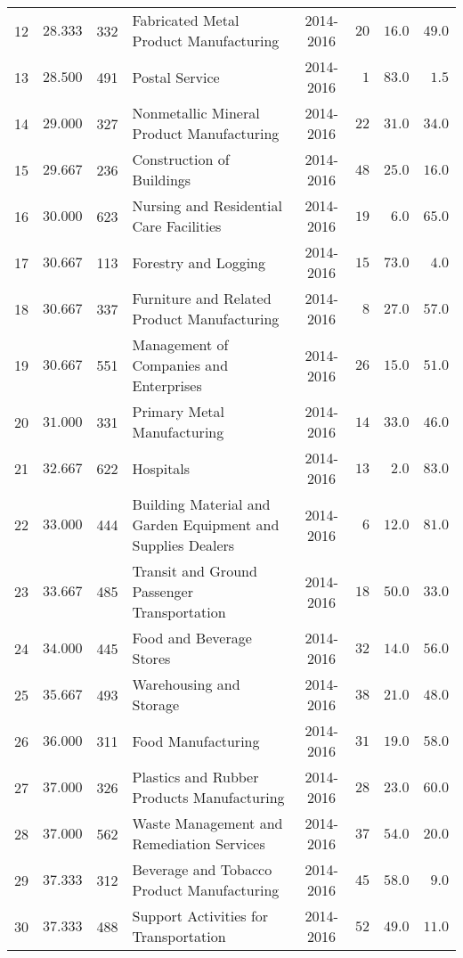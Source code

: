 \documentclass[9pt, oneside]{article}   	%
\begin{document}
\begin{longtable}{cccp{2.0in}cccc}
12  & $28.333$ & 332 & Fabricated Metal Product Manufacturing & 2014-2016 & $20$ & $16.0$ & $49.0$ \\
13  & $28.500$ & 491 & Postal Service & 2014-2016 & $\phantom{0}1$ & $83.0$ & $\phantom{0}1.5$ \\
14  & $29.000$ & 327 & Nonmetallic Mineral Product Manufacturing & 2014-2016 & $22$ & $31.0$ & $34.0$ \\
15  & $29.667$ & 236 & Construction of Buildings & 2014-2016 & $48$ & $25.0$ & $16.0$ \\
16  & $30.000$ & 623 & Nursing and Residential Care Facilities & 2014-2016 & $19$ & $\phantom{0}6.0$ & $65.0$ \\
17  & $30.667$ & 113 & Forestry and Logging & 2014-2016 & $15$ & $73.0$ & $\phantom{0}4.0$ \\
18  & $30.667$ & 337 & Furniture and Related Product Manufacturing & 2014-2016 & $\phantom{0}8$ & $27.0$ & $57.0$ \\
19  & $30.667$ & 551 & Management of Companies and Enterprises & 2014-2016 & $26$ & $15.0$ & $51.0$ \\
20  & $31.000$ & 331 & Primary Metal Manufacturing & 2014-2016 & $14$ & $33.0$ & $46.0$ \\
21  & $32.667$ & 622 & Hospitals & 2014-2016 & $13$ & $\phantom{0}2.0$ & $83.0$ \\
22  & $33.000$ & 444 & Building Material and Garden Equipment and Supplies Dealers & 2014-2016 & $\phantom{0}6$ & $12.0$ & $81.0$ \\
23  & $33.667$ & 485 & Transit and Ground Passenger Transportation & 2014-2016 & $18$ & $50.0$ & $33.0$ \\
24  & $34.000$ & 445 & Food and Beverage Stores & 2014-2016 & $32$ & $14.0$ & $56.0$ \\
25  & $35.667$ & 493 & Warehousing and Storage & 2014-2016 & $38$ & $21.0$ & $48.0$ \\
26  & $36.000$ & 311 & Food Manufacturing & 2014-2016 & $31$ & $19.0$ & $58.0$ \\
27  & $37.000$ & 326 & Plastics and Rubber Products Manufacturing & 2014-2016 & $28$ & $23.0$ & $60.0$ \\
28  & $37.000$ & 562 & Waste Management and Remediation Services & 2014-2016 & $37$ & $54.0$ & $20.0$ \\
29  & $37.333$ & 312 & Beverage and Tobacco Product Manufacturing & 2014-2016 & $45$ & $58.0$ & $\phantom{0}9.0$ \\
30  & $37.333$ & 488 & Support Activities for Transportation & 2014-2016 & $52$ & $49.0$ & $11.0$ \\

\end{longtable}
\end{document}
